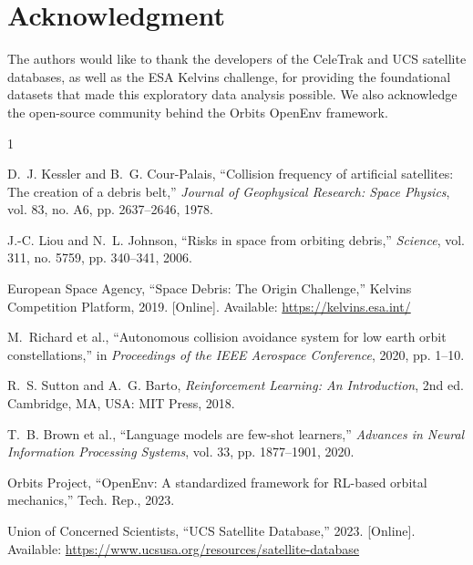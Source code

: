 \documentclass[10pt,journal,compsoc]{IEEEtran}
\begin{document}
\section*{Acknowledgment}
The authors would like to thank the developers of the CeleTrak and UCS satellite databases, as well as the ESA Kelvins challenge, for providing the foundational datasets that made this exploratory data analysis possible. We also acknowledge the open-source community behind the Orbits OpenEnv framework.

\begin{thebibliography}{1}

D.~J. Kessler and B.~G. Cour-Palais, ``Collision frequency of artificial satellites: The creation of a debris belt,'' \emph{Journal of Geophysical Research: Space Physics}, vol. 83, no. A6, pp. 2637--2646, 1978.

J.-C. Liou and N.~L. Johnson, ``Risks in space from orbiting debris,'' \emph{Science}, vol. 311, no. 5759, pp. 340--341, 2006.

European Space Agency, ``Space Debris: The Origin Challenge,'' Kelvins Competition Platform, 2019. [Online]. Available: \url{https://kelvins.esa.int/}

M.~Richard et al., ``Autonomous collision avoidance system for low earth orbit constellations,'' in \emph{Proceedings of the IEEE Aerospace Conference}, 2020, pp. 1--10.

R.~S. Sutton and A.~G. Barto, \emph{Reinforcement Learning: An Introduction}, 2nd ed. Cambridge, MA, USA: MIT Press, 2018.

T.~B. Brown et al., ``Language models are few-shot learners,'' \emph{Advances in Neural Information Processing Systems}, vol. 33, pp. 1877--1901, 2020.

Orbits Project, ``OpenEnv: A standardized framework for RL-based orbital mechanics,'' Tech. Rep., 2023.

Union of Concerned Scientists, ``UCS Satellite Database,'' 2023. [Online]. Available: \url{https://www.ucsusa.org/resources/satellite-database}

\end{thebibliography}

\vspace{2em}
\appendices
\end{document}
